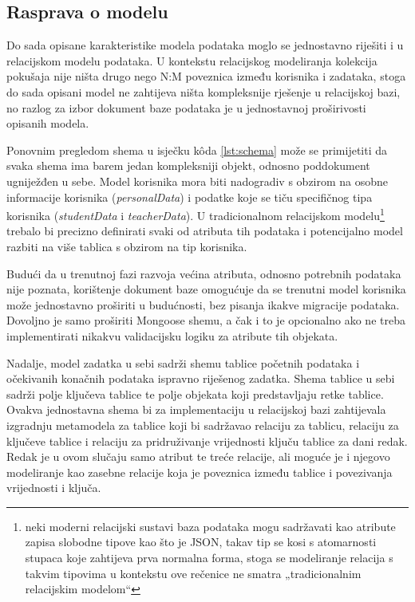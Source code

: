\documentclass[times, utf8, diplomski, numeric]{fer}
\newcommand{\razmakp}{\vspace{18pt}}
\newcommand{\razmaks}{\vspace{10pt}}
\begin{document}
\razmaks
\subsection{Rasprava o modelu}

Do sada opisane karakteristike modela podataka moglo se jednostavno riješiti i u relacijskom modelu podataka.
U kontekstu relacijskog modeliranja kolekcija pokušaja nije ništa drugo nego N:M poveznica između korisnika i zadataka, stoga do sada opisani model ne zahtijeva ništa kompleksnije rješenje u relacijskoj bazi, no razlog za izbor dokument baze podataka je u jednostavnoj proširivosti opisanih modela.

\razmakp

Ponovnim pregledom shema u isječku kôda \ref{lst:schema} može se primijetiti da svaka shema ima barem jedan kompleksniji objekt, odnosno poddokument ugniježđen u sebe.
Model korisnika mora biti nadogradiv s obzirom na osobne informacije korisnika (\emph{personalData}) i podatke koje se tiču specifičnog tipa korisnika (\emph{studentData} i \emph{teacherData}).
U tradicionalnom relacijskom modelu\footnote{
    neki moderni relacijski sustavi baza podataka mogu sadržavati kao atribute zapisa slobodne tipove kao što je JSON, takav tip se kosi s atomarnosti stupaca koje zahtijeva prva normalna forma, stoga se modeliranje relacija s takvim tipovima u kontekstu ove rečenice ne smatra „tradicionalnim relacijskim modelom“
} trebalo bi precizno definirati svaki od atributa tih podataka i potencijalno model razbiti na više tablica s obzirom na tip korisnika.

Budući da u trenutnoj fazi razvoja većina atributa, odnosno potrebnih podataka nije poznata, korištenje dokument baze omogućuje da se trenutni model korisnika može jednostavno proširiti u budućnosti, bez pisanja ikakve migracije podataka.
Dovoljno je samo proširiti Mongoose shemu, a čak i to je opcionalno ako ne treba implementirati nikakvu validacijsku logiku za atribute tih objekata.

\razmakp

Nadalje, model zadatka u sebi sadrži shemu tablice početnih podataka i očekivanih konačnih podataka ispravno riješenog zadatka.
Shema tablice u sebi sadrži polje ključeva tablice te polje objekata koji predstavljaju retke tablice.
Ovakva jednostavna shema bi za implementaciju u relacijskoj bazi zahtijevala izgradnju metamodela za tablice koji bi sadržavao relaciju za tablicu, relaciju za ključeve tablice i relaciju za pridruživanje vrijednosti ključu tablice za dani redak.
Redak je u ovom slučaju samo atribut te treće relacije, ali moguće je i njegovo modeliranje kao zasebne relacije koja je poveznica između tablice i povezivanja vrijednosti i ključa.
\end{document}
